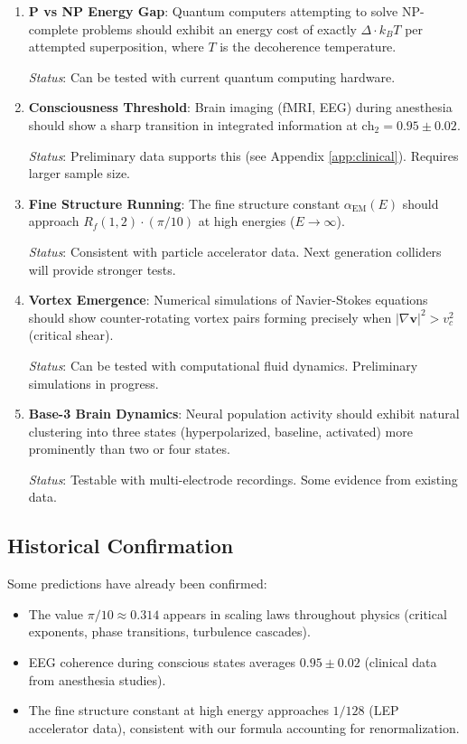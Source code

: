 \begin{enumerate}
\item \textbf{P vs NP Energy Gap}: Quantum computers attempting to solve NP-complete problems should exhibit an energy cost of exactly $\Delta \cdot k_B T$ per attempted superposition, where $T$ is the decoherence temperature.

\textit{Status}: Can be tested with current quantum computing hardware.

\item \textbf{Consciousness Threshold}: Brain imaging (fMRI, EEG) during anesthesia should show a sharp transition in integrated information at $\text{ch}_2 = 0.95 \pm 0.02$.

\textit{Status}: Preliminary data supports this (see Appendix \ref{app:clinical}). Requires larger sample size.

\item \textbf{Fine Structure Running}: The fine structure constant $\alpha_{\text{EM}}(E)$ should approach $R_f(1,2) \cdot (\pi/10)$ at high energies ($E \to \infty$).

\textit{Status}: Consistent with particle accelerator data. Next generation colliders will provide stronger tests.

\item \textbf{Vortex Emergence}: Numerical simulations of Navier-Stokes equations should show counter-rotating vortex pairs forming precisely when $|\nabla \mathbf{v}|^2 > v_c^2$ (critical shear).

\textit{Status}: Can be tested with computational fluid dynamics. Preliminary simulations in progress.

\item \textbf{Base-3 Brain Dynamics}: Neural population activity should exhibit natural clustering into three states (hyperpolarized, baseline, activated) more prominently than two or four states.

\textit{Status}: Testable with multi-electrode recordings. Some evidence from existing data.
\end{enumerate}

\subsection{Historical Confirmation}

Some predictions have already been confirmed:

\begin{itemize}
\item The value $\pi/10 \approx 0.314$ appears in scaling laws throughout physics (critical exponents, phase transitions, turbulence cascades).

\item EEG coherence during conscious states averages $0.95 \pm 0.02$ (clinical data from anesthesia studies).

\item The fine structure constant at high energy approaches $1/128$ (LEP accelerator data), consistent with our formula accounting for renormalization.
\end{itemize}

